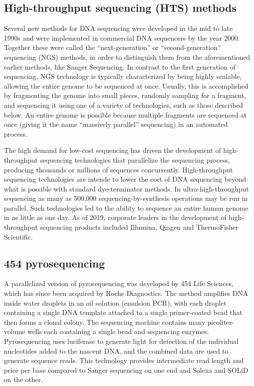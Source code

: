 \hypertarget{high-throughput-sequencing-hts-methods}{%
\subsection{High-throughput sequencing (HTS) methods}\label{high-throughput-sequencing-hts-methods}}

Several new methods for DNA sequencing were developed in the mid to late 1990s and were implemented in commercial DNA sequencers by the year 2000. Together these were called the ``next-generation'' or ``second-generation'' sequencing (NGS) methods, in order to distinguish them from the aforementioned earlier methods, like Sanger Sequencing. In contrast to the first generation of sequencing, NGS technology is typically characterized by being highly scalable, allowing the entire genome to be sequenced at once. Usually, this is accomplished by fragmenting the genome into small pieces, randomly sampling for a fragment, and sequencing it using one of a variety of technologies, such as those described below. An entire genome is possible because multiple fragments are sequenced at once (giving it the name ``massively parallel'' sequencing) in an automated process.

The high demand for low-cost sequencing has driven the development of high-throughput sequencing technologies that parallelize the sequencing process, producing thousands or millions of sequences concurrently. High-throughput sequencing technologies are intende to lower the cost of DNA sequencing beyond what is possible with standard dye-terminator methods. In ultra-high-throughput sequencing as many as 500,000 sequencing-by-synthesis operations may be run in parallel. Such technologies led to the ability to sequence an entire human genome in as little as one day. As of 2019, corporate leaders in the development of high-throughput sequencing products included Illumina, Qiagen and ThermoFisher Scientific.

\hypertarget{pyrosequencing}{%
\subsection{454 pyrosequencing}\label{pyrosequencing}}

A parallelized version of pyrosequencing was developed by 454 Life Sciences, which has since been acquired by Roche Diagnostics. The method amplifies DNA inside water droplets in an oil solution (emulsion PCR), with each droplet containing a single DNA template attached to a single primer-coated bead that then forms a clonal colony. The sequencing machine contains many picoliter-volume wells each containing a single bead and sequencing enzymes. Pyrosequencing uses luciferase to generate light for detection of the individual nucleotides added to the nascent DNA, and the combined data are used to generate sequence reads. This technology provides intermediate read length and price per base compared to Sanger sequencing on one end and Solexa and SOLiD on the other.

